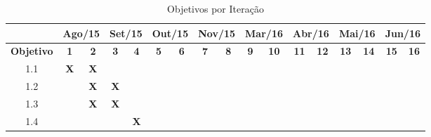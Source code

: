 \begin{table}[htb!]
\centering
\caption{Objetivos por Iteração}
\label{tab:cronograma}
\begin{tabular}{c|c|c|c|c|c|c|c|c|c|c|c|c|c|c|c|c|}
\cline{2-17}
{\bf }                                & \multicolumn{2}{c|}{{\bf Ago/15}}             & \multicolumn{2}{c|}{{\bf Set/15}}             & \multicolumn{2}{c|}{{\bf Out/15}}             & \multicolumn{2}{c|}{{\bf Nov/15}}             & \multicolumn{2}{c|}{{\bf Mar/16}}             & \multicolumn{2}{c|}{{\bf Abr/16}} & \multicolumn{2}{c|}{{\bf Mai/16}} & \multicolumn{2}{c|}{{\bf Jun/16}} \\ \hline
\multicolumn{1}{|c|}{{\bf Objetivo}}  & {\bf 1}               & {\bf 2}               & {\bf 3}               & {\bf 4}               & {\bf 5}               & {\bf 6}               & {\bf 7}               & {\bf 8}               & {\bf 9}               & {\bf 10}              & {\bf 11}        & {\bf 12}        & {\bf 13}        & {\bf 14}        & {\bf 15}        & {\bf 16}        \\ \hline
\multicolumn{1}{|c|}{1.1}             & {\bf X}               & {\bf X}               &                       &                       &                       &                       &                       &                       &                       &                       &                 &                 &                 &                 &                 &                 \\ \hline
\multicolumn{1}{|c|}{1.2}             &                       & {\bf X}               & {\bf X}               &                       &                       &                       &                       &                       &                       &                       &                 &                 &                 &                 &                 &                 \\ \hline
\multicolumn{1}{|c|}{1.3}             &                       & {\bf X}               & {\bf X}               &                       &                       &                       &                       &                       &                       &                       &                 &                 &                 &                 &                 &                 \\ \hline
\multicolumn{1}{|c|}{1.4}             &                       &                       &                       & {\bf X}               &                       &                       &                       &                       &                       &                       &                 &                 &                 &                 &                 &                 \\ \hline

\end{tabular}
\end{table}
